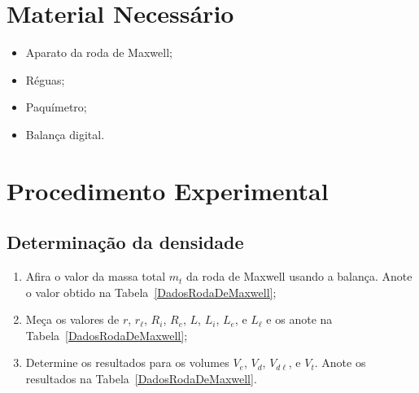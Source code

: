 \section{Material Necessário}

\begin{itemize}
	\item Aparato da roda de Maxwell;
    \item Réguas;
    \item Paquímetro;
	\item Balança digital.
\end{itemize}

\section{Procedimento Experimental}

\subsection{Determinação da densidade}
\begin{enumerate}
	\item Afira o valor da massa total $m_t$ da roda de Maxwell usando a balança. Anote o valor obtido na Tabela~\ref{DadosRodaDeMaxwell};
	\item Meça os valores de $r$, $r_\ell$, $R_i$, $R_e$, $L$, $L_i$, $L_e$, e $L_\ell$ e os anote na Tabela~\ref{DadosRodaDeMaxwell};
	\item Determine os resultados para os volumes $V_e$, $V_d$, $V_{d\ell}$, e $V_t$. Anote os resultados na Tabela~\ref{DadosRodaDeMaxwell}.
\end{enumerate}

